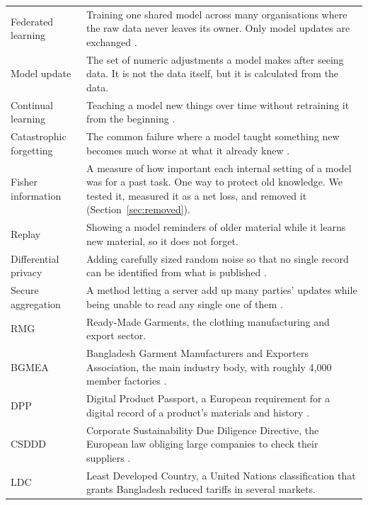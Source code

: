 \documentclass[11pt,a4paper]{article}
\begin{document}
\begin{table}[htbp]
\begin{tabularx}{\textwidth}{@{}l Y@{}}
Federated learning & Training one shared model across many organisations where
the raw data never leaves its owner. Only model updates are exchanged
\citep{mcmahan2017fedavg}. \\
Model update & The set of numeric adjustments a model makes after seeing data.
It is not the data itself, but it is calculated from the data. \\
Continual learning & Teaching a model new things over time without retraining
it from the beginning \citep{parisi2019review}. \\
Catastrophic forgetting & The common failure where a model taught something new
becomes much worse at what it already knew \citep{kirkpatrick2017ewc}. \\
Fisher information & A measure of how important each internal setting of a model
was for a past task. One way to protect old knowledge. We tested it, measured it
as a net loss, and removed it (Section~\ref{sec:removed}). \\
Replay & Showing a model reminders of older material while it learns new
material, so it does not forget. \\
Differential privacy & Adding carefully sized random noise so that no single
record can be identified from what is published \citep{dwork2014dp}. \\
Secure aggregation & A method letting a server add up many parties' updates
while being unable to read any single one of them
\citep{bonawitz2017secagg}. \\
RMG & Ready-Made Garments, the clothing manufacturing and export sector. \\
BGMEA & Bangladesh Garment Manufacturers and Exporters Association, the main
industry body, with roughly 4{,}000 member factories
\citep{bgmea2026aware}. \\
DPP & Digital Product Passport, a European requirement for a digital record of
a product's materials and history \citep{eu2024espr}. \\
CSDDD & Corporate Sustainability Due Diligence Directive, the European law
obliging large companies to check their suppliers \citep{eu2024csddd}. \\
LDC & Least Developed Country, a United Nations classification that grants
Bangladesh reduced tariffs in several markets. \\
\bottomrule
\end{tabularx}
\end{table}

\end{document}
